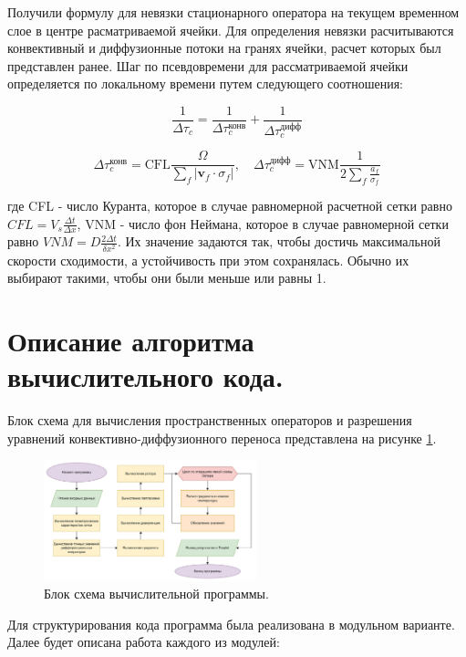 Получили формулу для невязки стационарного оператора на текущем временном слое в центре расматриваемой ячейки. Для определения невязки расчитываются конвективный и диффузионные потоки на гранях ячейки, расчет которых был представлен ранее. Шаг по псевдовремени для рассматриваемой ячейки определяется по локальному времени путем следующего соотношения:

$$ \frac{1}{\Delta \tau_c} = \frac{1}{\Delta \tau_c^\text{конв}} + \frac{1}{\Delta \tau_c^\text{дифф}}$$

$$
\Delta \tau_c^\text{конв} = \text{CFL} \frac{\Omega}{\sum_f |\mathbf{v}_f \cdot \sigma_f|}, \quad
\Delta \tau_c^\text{дифф} = \text{VNM} \frac{1}{2 \sum_f \frac{a_f}{\sigma_f}} $$

где CFL -  число Куранта, которое в случае равномерной расчетной сетки равно $CFL=V_s\frac{\Delta t}{\Delta x}$, VNM - число фон Неймана, которое в случае равномерной сетки равно $VNM=D\frac{2\Delta t}{\delta x^2}$. Их значение задаются так, чтобы достичь максимальной скорости сходимости, а устойчивость при этом сохранялась. Обычно их выбирают такими, чтобы они были меньше или равны 1.


\section{Описание алгоритма вычислительного кода.}
Блок схема для вычисления пространственных операторов и разрешения уравнений конвективно-диффузионного переноса представлена на рисунке \ref{fig:9}.

\begin{figure}[H]
    \centering
    \includegraphics[width=0.55\textwidth]{img/9.jpg}
    \caption{Блок схема вычислительной программы.}
    \label{fig:9}
\end{figure}

Для структурирования кода программа была реализована в модульном варианте. Далее будет описана работа каждого из модулей:

